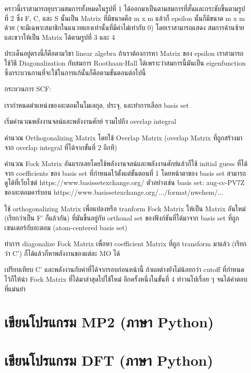 คราวนี้เราสามารถยุบรวมสมการทั้งหมดในรูปที่ 1 ได้ออกมาเป็นตามสมการที่สั้นและกระชับขึ้นตามรูปที่ 2 ซึ่ง F, C, และ S นั้นเป็น Matrix
ที่มีขนาดคือ m x m แล้วก็ epsilon นั้นก็มีขนาด m x m ด้วย (จะมีเฉพาะสมาชิกในแนวทแยงเท่านั้นที่มีค่าไม่เท่ากับ 0) โดยเราสามารถแสดง%
สมการด้านซ้ายและขวาให้เป็น Matrix ได้ตามรูปที่ 3 และ 4

ประเด็นอยู่ตรงนี้ก็คือตามวิชา linear algebra ถ้าเราต้องการหา Matrix ของ epsilon เราสามารถใช้วิธี Diagonalization กับสมการ
Roothaan-Hall ได้เพราะว่าสมการนี้มันเป็น eigenfunction ซึ่งกระบวนกานที่จะใช้ในการแก้นั้นก็คือตามขั้นตอนต่อไปนี้


กระบวนการ SCF:

เรากำหนดตำแหน่งของอะตอมในโมเลกุล, ประจุ, และทำการเลือก basis set

เริ่มคำนวณพลังงานจลน์และพลังงานศักย์ รวมไปถึง overlap integral

คำนวณ Orthogonalizing Matrix โดยใช้ Overlap Matrix (overlap Matrix ที่ถูกสร้างมาจาก overlap integral ที่ได้จากขั้นที่ 2 อีกที)

คำนวณ Fock Matrix อันแรกเลยโดยใช้พลังงานจลน์และพลังงานศักย์แล้วก็ใช้ initial guess ที่ได้จาก coefficients ของ basis set
ที่กำหนดไว้ตั้งแต่ขั้นตอนที่ 1 โดยหน้าตาของ basis set สามารถดูได้ที่เว็บไซต์ https://www.basissetexchange.org/ ตัวอย่างเช่น
basis set: aug-cc-PV7Z ของอะตอมคาร์บอน https://www.basissetexchange.org/.../format/nwchem/...

ใช้ orthogonalizing Matrix เพื่อแปลงหรือ tranform Fock Matrix ให้เป็น Matrix อันใหม่ (เรียกว่าเป็น F' ก็แล้วกัน) ที่มันขึ้นอยู่กับ
orthonal set ของฟังก์ชันที่ได้มาจาก basis set ที่ถูกเซนเตอร์กับอะตอม (atom-centered basis set)

ทำการ diagonalize Fock Matrix เพื่อหา coefficient Matrix ที่ถูก transform มาแล้ว (เรียกว่า C') ก็ได้แล้วก็หาพลังงานของแต่ละ MO ได้

เปรียบเทียบ C' และพลังงานกับค่าที่ได้จากรอบก่อนหน้านี้ ถ้าผลต่างยังไม่น้อยกว่า cutoff ที่กำหนดไว้ก็ให้นำ Fock Matrix ที่ได้มาล่าสุดไปใช้ใหม่%
อีกครั้งหนึ่งในขั้นที่ 4 ทำวนไปเรื่อย ๆ จนได้คำตอบที่แม่นยำ

\section{เขียนโปรแกรม MP2 (ภาษา Python)}

\section{เขียนโปรแกรม DFT (ภาษา Python)}

